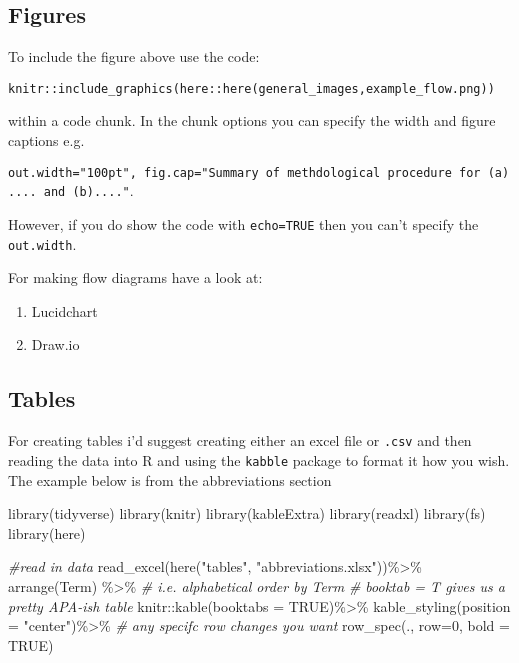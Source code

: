 \documentclass[
  12pt,
  oneside]{book}
\newenvironment{Shaded}{\begin{snugshade}}{\end{snugshade}}
\newcommand{\AttributeTok}[1]{\textcolor[rgb]{0.77,0.63,0.00}{#1}}
\newcommand{\CommentTok}[1]{\textcolor[rgb]{0.56,0.35,0.01}{\textit{#1}}}
\newcommand{\ConstantTok}[1]{\textcolor[rgb]{0.00,0.00,0.00}{#1}}
\newcommand{\DecValTok}[1]{\textcolor[rgb]{0.00,0.00,0.81}{#1}}
\newcommand{\FunctionTok}[1]{\textcolor[rgb]{0.00,0.00,0.00}{#1}}
\newcommand{\NormalTok}[1]{#1}
\newcommand{\SpecialCharTok}[1]{\textcolor[rgb]{0.00,0.00,0.00}{#1}}
\newcommand{\StringTok}[1]{\textcolor[rgb]{0.31,0.60,0.02}{#1}}
\providecommand{\tightlist}{%
  \setlength{\itemsep}{0pt}\setlength{\parskip}{0pt}}
\begin{document}
\hypertarget{figures-1}{%
\subsection{Figures}\label{figures-1}}

To include the figure above use the code:

\texttt{knitr::include\_graphics(here::here(\textquotesingle{}general\_images\textquotesingle{},\textquotesingle{}example\_flow.png\textquotesingle{}))}

within a code chunk. In the chunk options you can specify the width and figure captions e.g.~

\texttt{out.width="100pt",\ fig.cap="Summary\ of\ methdological\ procedure\ for\ (a)....\ and\ (b)...."}.

However, if you do show the code with \texttt{echo=TRUE} then you can't specify the \texttt{out.width}.

For making flow diagrams have a look at:

\begin{enumerate}
\def\labelenumi{\arabic{enumi}.}
\tightlist
\item
  Lucidchart
\item
  Draw.io
\end{enumerate}

\hypertarget{tables-1}{%
\subsection{Tables}\label{tables-1}}

For creating tables i'd suggest creating either an excel file or \texttt{.csv} and then reading the data into R and using the \texttt{kabble} package to format it how you wish. The example below is from the abbreviations section

\begin{Shaded}
\begin{Highlighting}[]
\FunctionTok{library}\NormalTok{(tidyverse)}
\FunctionTok{library}\NormalTok{(knitr)}
\FunctionTok{library}\NormalTok{(kableExtra)}
\FunctionTok{library}\NormalTok{(readxl)}
\FunctionTok{library}\NormalTok{(fs)}
\FunctionTok{library}\NormalTok{(here)}

\CommentTok{\#read in data}
\FunctionTok{read\_excel}\NormalTok{(}\FunctionTok{here}\NormalTok{(}\StringTok{"tables"}\NormalTok{, }\StringTok{"abbreviations.xlsx"}\NormalTok{))}\SpecialCharTok{\%\textgreater{}\%}
  \FunctionTok{arrange}\NormalTok{(Term) }\SpecialCharTok{\%\textgreater{}\%} \CommentTok{\# i.e. alphabetical order by Term}
  \CommentTok{\# booktab = T gives us a pretty APA{-}ish table}
\NormalTok{  knitr}\SpecialCharTok{::}\FunctionTok{kable}\NormalTok{(}\AttributeTok{booktabs =} \ConstantTok{TRUE}\NormalTok{)}\SpecialCharTok{\%\textgreater{}\%} 
  \FunctionTok{kable\_styling}\NormalTok{(}\AttributeTok{position =} \StringTok{"center"}\NormalTok{)}\SpecialCharTok{\%\textgreater{}\%}
  \CommentTok{\# any specifc row changes you want}
    \FunctionTok{row\_spec}\NormalTok{(.,}
  \AttributeTok{row=}\DecValTok{0}\NormalTok{,}
  \AttributeTok{bold =} \ConstantTok{TRUE}\NormalTok{)}
\end{Highlighting}
\end{Shaded}
\end{document}
